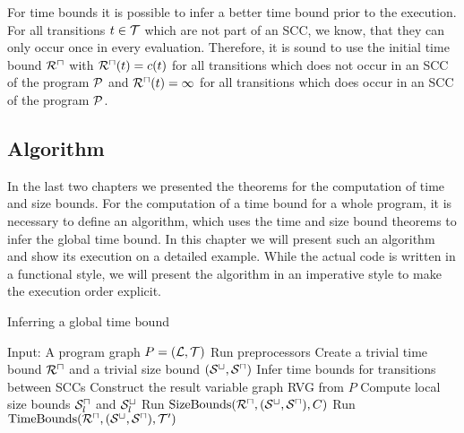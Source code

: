 For time bounds it is possible to infer a better time bound prior to the execution.
For all transitions $t \in \mathcal{T}$ which are not part of an SCC, we know, that they can only occur once in every evaluation.
Therefore, it is sound to use the initial time bound ${\mathcal{R}^\sqcap}$ with ${\mathcal{R}^\sqcap}(t) = c(t)$ for all transitions which does not occur in an SCC of the program $\mathcal{P}$ and ${\mathcal{R}^\sqcap}(t) = \infty$ for all transitions which does occur in an SCC of the program $\mathcal{P}$.

\subsection{Algorithm}

In the last two chapters we presented the theorems for the computation of time and size bounds.
For the computation of a time bound for a whole program, it is necessary to define an algorithm, which uses the time and size bound theorems to infer the global time bound.
In this chapter we will present such an algorithm and show its execution on a detailed example.
While the actual code is written in a functional style, we will present the algorithm in an imperative style to make the execution order explicit.

\begin{algorithm}
\caption{Inferring a global time bound}\label{complete_algorithm}
\begin{algorithmic}[1]
  \State Input: A program graph $P = (\mathcal{L}, \mathcal{T})$
  \State Run preprocessors
  \State Create a trivial time bound ${\mathcal{R}^\sqcap}$ and a trivial size bound ${({\mathcal{S}^\sqcup}, {\mathcal{S}^\sqcap})}$
  \State Infer time bounds for transitions between SCCs
  \State Construct the result variable graph RVG from $P$
  \State Compute local size bounds ${\mathcal{S}^\sqcap_l}$ and ${\mathcal{S}^\sqcup_l}$
  \Repeat
      \State Run $\text{SizeBounds}({\mathcal{R}^\sqcap}, {({\mathcal{S}^\sqcup}, {\mathcal{S}^\sqcap})}, C)$
    \EndFor
      \State Run $\text{TimeBounds}({\mathcal{R}^\sqcap}, {({\mathcal{S}^\sqcup}, {\mathcal{S}^\sqcap})}, \mathcal{T}')$
    \EndFor
\end{algorithmic}
\end{algorithm}
